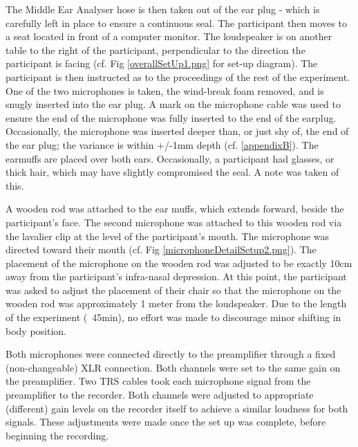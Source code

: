 \documentclass[dissertation,copyright]{uathesis}
\begin{document}
The Middle Ear Analyser hose is then taken out of the ear plug - which is carefully left in place to ensure a continuous seal.  The participant then moves to a seat located in front of a computer monitor.  The loudspeaker is on another table to the right of the participant, perpendicular to the direction the participant is facing (cf. Fig \ref{overallSetUp1.png} for set-up diagram).  The participant is then instructed as to the proceedings of the rest of the experiment. One of the two microphones is taken, the wind-break foam removed, and is snugly inserted into the ear plug.  A mark on the microphone cable was used to ensure the end of the microphone was fully inserted to the end of the earplug.  Occasionally, the microphone was inserted deeper than, or just shy of, the end of the ear plug; the variance is within +/-1mm depth (cf. \ref{appendixB}).  The earmuffs are placed over both ears.  Occasionally, a participant had glasses, or thick hair, which may have slightly compromised the seal.  A note was taken of this. 

A wooden rod was attached to the ear muffs, which extends forward, beside the participant's face.  The second microphone was attached to this wooden rod via the lavalier clip at the level of the participant's mouth.  The microphone was directed toward their mouth (cf. Fig \ref{microphoneDetailSetup2.png}).  The placement of the microphone on the wooden rod was adjusted to be exactly 10cm away from the participant's infra-nasal depression.  At this point, the participant was asked to adjust the placement of their chair so that the microphone on the wooden rod was approximately 1 meter from the loudspeaker. Due to the length of the experiment (~45min), no effort was made to discourage minor shifting in body position.  

Both microphones were connected directly to the preamplifier through a fixed (non-changeable) XLR connection.  Both channels were set to the same gain on the preamplifier.  Two TRS cables took each microphone signal from the preamplifier to the recorder.  Both channels were adjusted to appropriate (different) gain levels on the recorder itself to achieve a similar loudness for both signals.  These adjustments were made once the set up was complete, before beginning the recording.
\end{document}
